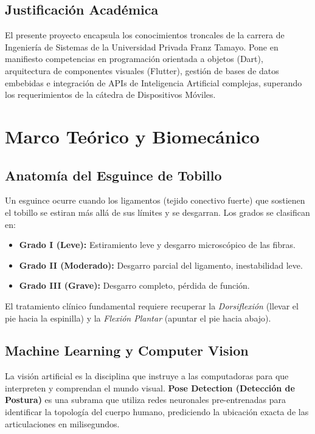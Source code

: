 \documentclass[12pt, a4paper]{article}
\begin{document}
\subsection{Justificación Académica}
El presente proyecto encapsula los conocimientos troncales de la carrera de Ingeniería de Sistemas de la Universidad Privada Franz Tamayo. Pone en manifiesto competencias en programación orientada a objetos (Dart), arquitectura de componentes visuales (Flutter), gestión de bases de datos embebidas e integración de APIs de Inteligencia Artificial complejas, superando los requerimientos de la cátedra de Dispositivos Móviles.

\section{Marco Teórico y Biomecánico}
\subsection{Anatomía del Esguince de Tobillo}
Un esguince ocurre cuando los ligamentos (tejido conectivo fuerte) que sostienen el tobillo se estiran más allá de sus límites y se desgarran. Los grados se clasifican en:
\begin{itemize}
    \item \textbf{Grado I (Leve):} Estiramiento leve y desgarro microscópico de las fibras.
    \item \textbf{Grado II (Moderado):} Desgarro parcial del ligamento, inestabilidad leve.
    \item \textbf{Grado III (Grave):} Desgarro completo, pérdida de función.
\end{itemize}
El tratamiento clínico fundamental requiere recuperar la \textit{Dorsiflexión} (llevar el pie hacia la espinilla) y la \textit{Flexión Plantar} (apuntar el pie hacia abajo).

\subsection{Machine Learning y Computer Vision}
La visión artificial es la disciplina que instruye a las computadoras para que interpreten y comprendan el mundo visual. \textbf{Pose Detection (Detección de Postura)} es una subrama que utiliza redes neuronales pre-entrenadas para identificar la topología del cuerpo humano, prediciendo la ubicación exacta de las articulaciones en milisegundos.

\end{document}
